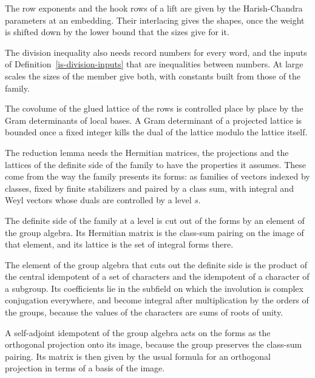 The row exponents and the hook rows of a lift are given by the Harish-Chandra
parameters at an embedding. Their interlacing gives the shapes, once the
weight is shifted down by the lower bound that the sizes give for it.

The division inequality also needs record numbers for every word, and the
inputs of Definition~\ref{is-division-inputs} that are inequalities between
numbers. At large scales the sizes of the member give both, with constants
built from those of the family.

The covolume of the glued lattice of the rows is controlled place by place by
the Gram determinants of local bases. A Gram determinant of a projected lattice
is bounded once a fixed integer kills the dual of the lattice modulo the
lattice itself.

The reduction lemma needs the Hermitian matrices, the projections and the
lattices of the definite side of the family to have the properties it assumes.
These come from the way the family presents its forms: as families of vectors
indexed by classes, fixed by finite stabilizers and paired by a class sum, with
integral and Weyl vectors whose duals are controlled by a level $s$.

The definite side of the family at a level is cut out of the forms by an
element of the group algebra. Its Hermitian matrix is the class-sum pairing on
the image of that element, and its lattice is the set of integral forms there.

The element of the group algebra that cuts out the definite side is the
product of the central idempotent of a set of characters and the idempotent of
a character of a subgroup. Its coefficients lie in the subfield on which the
involution is complex conjugation everywhere, and become integral after
multiplication by the orders of the groups, because the values of the
characters are sums of roots of unity.

A self-adjoint idempotent of the group algebra acts on the forms as the
orthogonal projection onto its image, because the group preserves the
class-sum pairing. Its matrix is then given by the usual formula for an
orthogonal projection in terms of a basis of the image.

